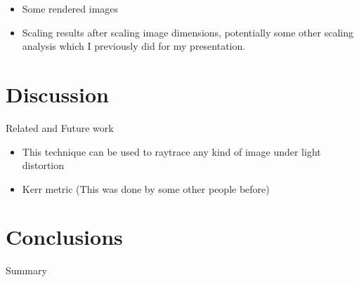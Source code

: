 \begin{itemize}
	\item Some rendered images
    	\item Scaling results after scaling image dimensions, potentially some other scaling analysis 
      which I previously did for my presentation.
\end{itemize}



\section{Discussion}
\label{sec:disc}

Related and Future work
\begin{itemize}
	\item This technique can be used to raytrace any kind of image under light distortion
    	\item Kerr metric (This was done by some other people before)
\end{itemize}


\section{Conclusions}
\label{sec:concl}

Summary

